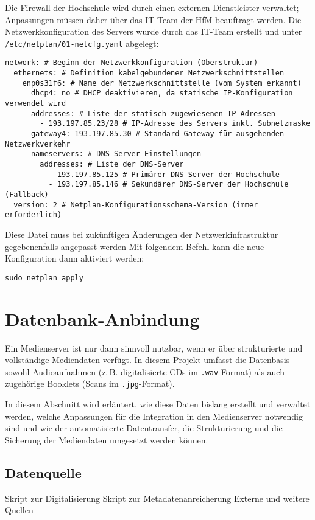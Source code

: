 \documentclass[12pt,a4paper]{report}
\begin{document}
  Die Firewall der Hochschule wird durch einen externen Dienstleister verwaltet; Anpassungen müssen daher über das IT-Team der HfM beauftragt werden. 
  Die Netzwerkkonfiguration des Servers wurde durch das IT-Team erstellt und unter \texttt{/etc/netplan/01-netcfg.yaml} abgelegt:

  \begin{verbatim}
network: # Beginn der Netzwerkkonfiguration (Oberstruktur)
  ethernets: # Definition kabelgebundener Netzwerkschnittstellen
    enp0s31f6: # Name der Netzwerkschnittstelle (vom System erkannt)
      dhcp4: no # DHCP deaktivieren, da statische IP-Konfiguration verwendet wird
      addresses: # Liste der statisch zugewiesenen IP-Adressen
        - 193.197.85.23/28 # IP-Adresse des Servers inkl. Subnetzmaske
      gateway4: 193.197.85.30 # Standard-Gateway für ausgehenden Netzwerkverkehr
      nameservers: # DNS-Server-Einstellungen
        addresses: # Liste der DNS-Server
          - 193.197.85.125 # Primärer DNS-Server der Hochschule
          - 193.197.85.146 # Sekundärer DNS-Server der Hochschule (Fallback)
  version: 2 # Netplan-Konfigurationsschema-Version (immer erforderlich)
  \end{verbatim}

  Diese Datei muss bei zukünftigen Änderungen der Netzwerkinfrastruktur gegebenenfalls angepasst werden
  Mit folgendem Befehl kann die neue Konfiguration dann aktiviert werden:

  \begin{verbatim}
sudo netplan apply
  \end{verbatim}

\section{Datenbank-Anbindung}
Ein Medienserver ist nur dann sinnvoll nutzbar, wenn er über strukturierte und vollständige Mediendaten verfügt. 
In diesem Projekt umfasst die Datenbasis sowohl Audioaufnahmen (z.\,B. digitalisierte CDs im \texttt{.wav}-Format) 
als auch zugehörige Booklets (Scans im \texttt{.jpg}-Format).  

In diesem Abschnitt wird erläutert, wie diese Daten bislang erstellt und verwaltet werden, 
welche Anpassungen für die Integration in den Medienserver notwendig sind und 
wie der automatisierte Datentransfer, die Strukturierung und die Sicherung der Mediendaten umgesetzt werden können.  
 
    \subsection{Datenquelle}
    Skript zur Digitalisierung
    Skript zur Metadatenanreicherung
    Externe und weitere Quellen
\end{document}

